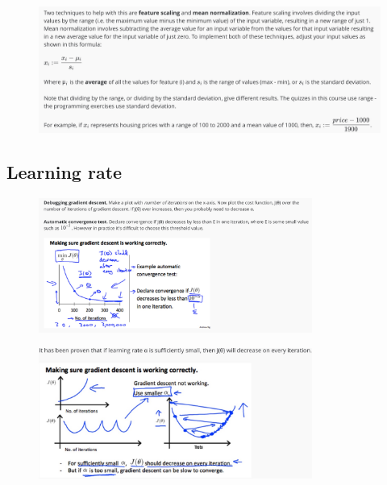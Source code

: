 \documentclass[12pt, A4,onecolumn]{article} %
\begin{document}
\begin{figure}[H]
	\centering
	\includegraphics[width=1\textwidth]{./Imagenes/featScal2}
\end{figure}

\subsection{Learning rate}

\begin{figure}[H]
	\centering
	\includegraphics[width=0.8\textwidth]{./Imagenes/learnR1}
\end{figure}

\begin{figure}[H]
	\centering
	\includegraphics[width=0.8\textwidth]{./Imagenes/learnR2}
\end{figure}
\end{document}
